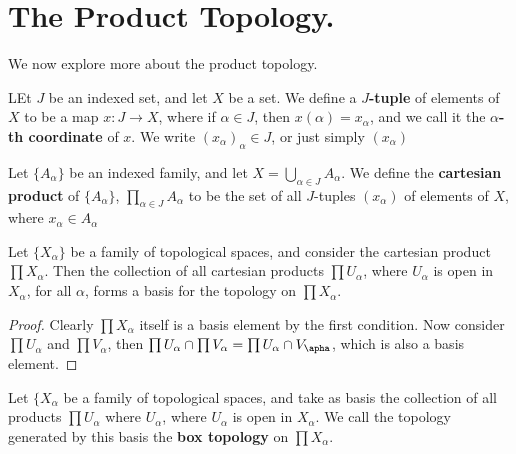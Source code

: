 
\section{The Product Topology.}

We now explore more about the product topology.

\begin{definition}
    LEt $J$ be an indexed set, and let  $X$ be a set. We define a  \textbf{$J$-tuple} of elements of
    $X$ to be a map $x:J \rightarrow X$, where if  $\alpha \in J$, then  $x(\alpha)=x_{\alpha}$, and
    we call it the \textbf{$\alpha$-th coordinate} of $x$. We write  $(x_{\alpha})_\alpha \in J$, or
just simply $(x_{\alpha})$
\end{definition}

\begin{definition}
Let $\{A_{\alpha}\}$ be an indexed family, and let $X=\bigcup_{\alpha \in J}{A_{\alpha}}$. We define
the \textbf{cartesian product} of $\{A_{\alpha}\}$, $\prod_{\alpha \in J}{A_\alpha}$ to be the set of
all $J$-tuples  $(x_{\alpha})$ of elements of $X$, where  $x_{\alpha} \in A_{\alpha}$
\end{definition}

\begin{theorem}\label{2.1.1}
    Let $\{X_{\alpha}\}$ be a family of topological spaces, and consider the cartesian product
    $\prod{X_{\alpha}}$. Then the collection of all cartesian products $\prod{U_{\alpha}}$, where
    $U_{\alpha}$ is open in $X_{\alpha}$, for all $\alpha$, forms a basis for the topology on
    $\prod{X_{\alpha}}$.
\end{theorem}
\begin{proof}
    Clearly $\prod{X_{\alpha}}$ itself is a basis element by the first condition. Now consider
    $\prod{U_{\alpha}}$ and $\prod{V_{\alpha}}$, then $\prod{U_{\alpha}} \cap
    \prod{V_{\alpha}}=\prod{U_{\alpha} \cap V_{\apha}}$, which is also a basis element.
\end{proof}

\begin{definition}
Let $\{X_{\alpha}$ be a family of topological spaces, and take as basis the collection of all
    products $\prod{U_{\alpha}}$ where $U_{\alpha}$, where $U_{\alpha}$ is open in $X_{\alpha}$.
    We call the topology generated by this basis the \textbf{box topology} on $\prod{X_{\alpha}}$.		
\end{definition}

